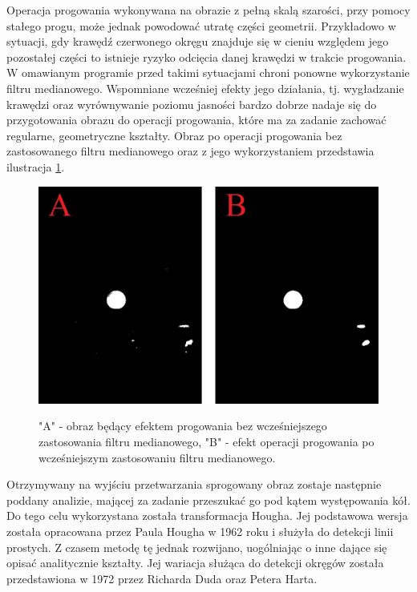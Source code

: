 Operacja progowania wykonywana na obrazie z pełną skalą szarości, przy pomocy stałego progu, może jednak powodować utratę części geometrii. Przykładowo w sytuacji, gdy krawędź czerwonego okręgu znajduje się w cieniu względem jego pozostałej części to istnieje ryzyko odcięcia danej krawędzi w trakcie progowania. W omawianym programie przed takimi sytuacjami chroni ponowne wykorzystanie filtru medianowego. Wspomniane wcześniej efekty jego działania, tj. wygładzanie krawędzi oraz wyrównywanie poziomu jasności bardzo dobrze nadaje się do przygotowania obrazu do operacji progowania, które ma za zadanie zachować regularne, geometryczne kształty. Obraz po operacji progowania bez zastosowanego filtru medianowego oraz z jego wykorzystaniem przedstawia ilustracja \ref{threshold}.
\begin{figure}[H]
\begin{center}
\includegraphics[scale=0.42]{imgs/threshold.jpg}
\caption[Efekt progowania z oraz bez filtru medianowego.]\small{"A" - obraz będący efektem progowania bez wcześniejszego zastosowania filtru medianowego, "B" - efekt operacji progowania po wcześniejszym zastosowaniu filtru medianowego.}
\label{threshold}
\end{center}
\end{figure}

Otrzymywany na wyjściu przetwarzania sprogowany obraz zostaje następnie poddany analizie, mającej za zadanie przeszukać go pod kątem występowania kół. Do tego celu wykorzystana została transformacja Hougha. Jej podstawowa wersja została opracowana przez Paula Hougha w 1962 roku i służyła do detekcji linii prostych. Z czasem metodę tę jednak rozwijano, uogólniając o inne dające się opisać analitycznie kształty. Jej wariacja służąca do detekcji okręgów została przedstawiona w 1972 przez Richarda Duda oraz Petera Harta.

